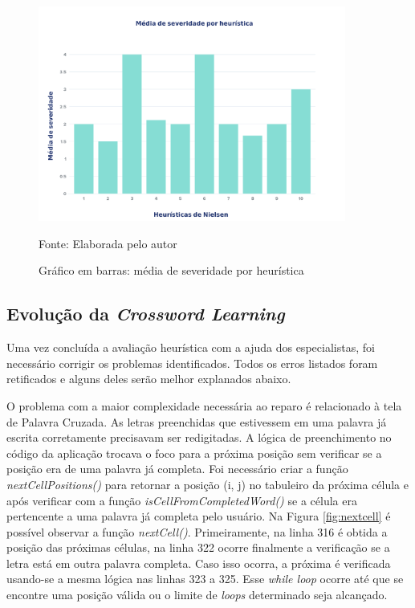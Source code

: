 \begin{figure}[H]
\centering
    \caption{Gráfico em barras: média de severidade por heurística}
    \label{fig:barra-media-heuristica}
    \includegraphics[width=0.9\textwidth]{Figuras/severidade-heuristica.png}
    
    Fonte: Elaborada pelo autor
\end{figure}

\subsection{Evolução da \textit{Crossword Learning}}
Uma vez concluída a avaliação heurística com a ajuda dos especialistas, foi necessário corrigir os problemas identificados. Todos os erros listados foram retificados e alguns deles serão melhor explanados abaixo.

O problema com a maior complexidade necessária ao reparo é relacionado à tela de Palavra Cruzada. As letras preenchidas que estivessem em uma palavra já escrita corretamente precisavam ser redigitadas. A lógica de preenchimento no código da aplicação trocava o foco para a próxima posição sem verificar se a posição era de uma palavra já completa. Foi necessário criar a função \textit{nextCellPositions()} para retornar a posição (i, j) no tabuleiro da próxima célula e após verificar com a função \textit{isCellFromCompletedWord()} se a célula era pertencente a uma palavra já completa pelo usuário. Na Figura \ref{fig:nextcell} é possível observar a função \textit{nextCell()}. Primeiramente, na linha 316 é obtida a posição das próximas células, na linha 322 ocorre finalmente a verificação se a letra está em outra palavra completa. Caso isso ocorra, a próxima é verificada usando-se a mesma lógica nas linhas 323 a 325. Esse \textit{while loop} ocorre até que se encontre uma posição válida ou o limite de \textit{loops} determinado seja alcançado.

